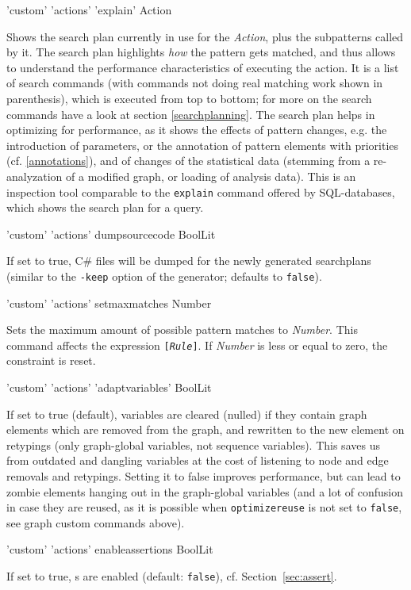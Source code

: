 \begin{rail}
  'custom' 'actions' 'explain' Action
\end{rail}
Shows the search plan currently in use for the \emph{Action}, plus the subpatterns called by it.
The search plan highlights \emph{how} the pattern gets matched, and thus allows to understand the performance characteristics of executing the action.
It is a list of search commands (with commands not doing real matching work shown in parenthesis), which is executed from top to bottom; for more on the search commands have a look at section \ref{searchplanning}.
The search plan helps in optimizing for performance, as it shows the effects of pattern changes, e.g. the introduction of parameters, or the annotation of pattern elements with priorities (cf. \ref{annotations}), and of changes of the statistical data (stemming from a re-analyzation of a modified graph, or loading of analysis data).
This is an inspection tool comparable to the \texttt{explain} command offered by SQL-databases, which shows the search plan for a query.

\begin{rail}
  'custom' 'actions' dumpsourcecode BoolLit
\end{rail}
If set to true, C\# files will be dumped for the newly generated searchplans (similar to the \texttt{-keep} option of the generator; defaults to \texttt{false}).

\begin{rail}
  'custom' 'actions' setmaxmatches Number
\end{rail}
Sets the maximum amount of possible pattern matches to \emph{Number}.
This command affects the expression \texttt{[\emph{Rule}]}.
If \emph{Number} is less or equal to zero, the constraint is reset.

\begin{rail}
  'custom' 'actions' 'adaptvariables' BoolLit
\end{rail}
If set to true (default), variables are cleared (nulled) if they contain graph elements which are removed from the graph, and rewritten to the new element on retypings (only graph-global variables, not sequence variables).
This saves us from outdated and dangling variables at the cost of listening to node and edge removals and retypings.
Setting it to false improves performance, but can lead to zombie elements hanging out in the graph-global variables (and a lot of confusion in case they are reused, as it is possible when \texttt{optimizereuse} is not set to \texttt{false}, see graph custom commands above).

\begin{rail}
  'custom' 'actions' enableassertions BoolLit
\end{rail}\label{enableassertions}
If set to true, s are enabled (default: \texttt{false}), cf. Section~\ref{sec:assert}.

